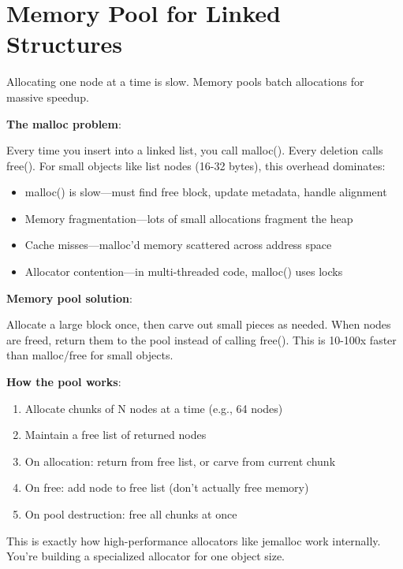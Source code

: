 \section{Memory Pool for Linked Structures}

Allocating one node at a time is slow. Memory pools batch allocations for massive speedup.

\textbf{The malloc problem}:

Every time you insert into a linked list, you call malloc(). Every deletion calls free(). For small objects like list nodes (16-32 bytes), this overhead dominates:
\begin{itemize}
    \item malloc() is slow—must find free block, update metadata, handle alignment
    \item Memory fragmentation—lots of small allocations fragment the heap
    \item Cache misses—malloc'd memory scattered across address space
    \item Allocator contention—in multi-threaded code, malloc() uses locks
\end{itemize}

\textbf{Memory pool solution}:

Allocate a large block once, then carve out small pieces as needed. When nodes are freed, return them to the pool instead of calling free(). This is 10-100x faster than malloc/free for small objects.

\textbf{How the pool works}:
\begin{enumerate}
    \item Allocate chunks of N nodes at a time (e.g., 64 nodes)
    \item Maintain a free list of returned nodes
    \item On allocation: return from free list, or carve from current chunk
    \item On free: add node to free list (don't actually free memory)
    \item On pool destruction: free all chunks at once
\end{enumerate}

This is exactly how high-performance allocators like jemalloc work internally. You're building a specialized allocator for one object size.

